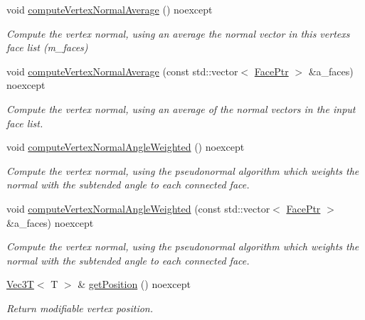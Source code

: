 \begin{DoxyCompactItemize}
void \hyperlink{classDcel_1_1VertexT_adb439515e1814e3fdd9d040b9c1b22df}{compute\+Vertex\+Normal\+Average} () noexcept
\begin{DoxyCompactList}\small\item\em Compute the vertex normal, using an average the normal vector in this vertex\textquotesingle{}s face list (m\+\_\+faces) \end{DoxyCompactList}\item 
void \hyperlink{classDcel_1_1VertexT_a6faffb2c5038d62c2f7866736ebe7393}{compute\+Vertex\+Normal\+Average} (const std\+::vector$<$ \hyperlink{classDcel_1_1VertexT_a5acb4c66c49319683c71f52e56ad8e8a}{Face\+Ptr} $>$ \&a\+\_\+faces) noexcept
\begin{DoxyCompactList}\small\item\em Compute the vertex normal, using an average of the normal vectors in the input face list. \end{DoxyCompactList}\item 
void \hyperlink{classDcel_1_1VertexT_aa9e66780ec134afe94d9e5a8221fdc0e}{compute\+Vertex\+Normal\+Angle\+Weighted} () noexcept
\begin{DoxyCompactList}\small\item\em Compute the vertex normal, using the pseudonormal algorithm which weights the normal with the subtended angle to each connected face. \end{DoxyCompactList}\item 
void \hyperlink{classDcel_1_1VertexT_aea793773eec08852108d3bd5c4eea5a9}{compute\+Vertex\+Normal\+Angle\+Weighted} (const std\+::vector$<$ \hyperlink{classDcel_1_1VertexT_a5acb4c66c49319683c71f52e56ad8e8a}{Face\+Ptr} $>$ \&a\+\_\+faces) noexcept
\begin{DoxyCompactList}\small\item\em Compute the vertex normal, using the pseudonormal algorithm which weights the normal with the subtended angle to each connected face. \end{DoxyCompactList}\item 
\mbox{\label{classDcel_1_1VertexT_af3ecf093a2fc7fd0f728d463ccacb8ce}} 
\hyperlink{classVec3T}{Vec3T}$<$ T $>$ \& \hyperlink{classDcel_1_1VertexT_af3ecf093a2fc7fd0f728d463ccacb8ce}{get\+Position} () noexcept
\begin{DoxyCompactList}\small\item\em Return modifiable vertex position. \end{DoxyCompactList}\item 

\end{DoxyCompactItemize}
